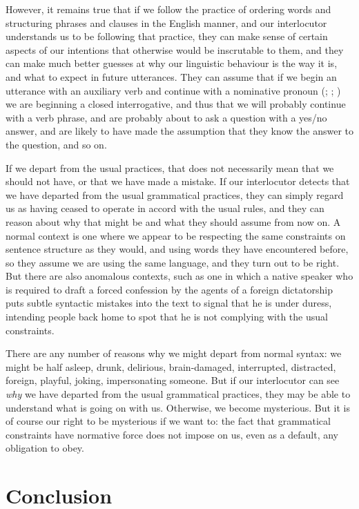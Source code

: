 \documentclass[output=paper]{langscibook}
\begin{document}
However, it remains true that if we follow the practice of ordering words and structuring phrases and clauses in the English manner, and our interlocutor understands us to be following that practice, they can make sense of certain aspects of our intentions that otherwise would be inscrutable to them, and they can make much better guesses at why our linguistic behaviour is the way it is, and what to expect in future utterances.  They can assume that if we begin an utterance with an auxiliary verb and continue with a nominative pronoun (; ; ) we are beginning a closed interrogative, and thus that we will probably continue with a verb phrase, and are probably about to ask a question with a yes/no answer, and are likely to have made the assumption that they know the answer to the question, and so on.

If we depart from the usual practices, that does not necessarily mean that we should not have, or that we have made a mistake.  If our interlocutor detects that we have departed from the usual grammatical practices, they can simply regard us as having ceased to operate in accord with the usual rules, and they can reason about why that might be and what they should assume from now on. A normal context is one where we appear to be respecting the same constraints on sentence structure as they would, and using words they have encountered before, so they assume we are using the same language, and they turn out to be right. But there are also anomalous contexts, such as one in which a native speaker who is required to draft a forced confession by the agents of a foreign dictatorship puts subtle syntactic mistakes into the text to signal that he is under duress, intending people back home to spot that he is not complying with the usual constraints.

There are any number of reasons why we might depart from normal syntax: we might be half asleep, drunk, delirious, brain-damaged, interrupted, distracted, foreign, playful, joking, impersonating someone. But if our interlocutor can see \emph{why} we have departed from the usual grammatical practices, they may be able to understand what is going on with us. Otherwise, we become mysterious. But it is of course our right to be mysterious if we want to: the fact that grammatical constraints have normative force does not impose on us, even as a default, any obligation to obey.

\section{Conclusion}
\label{sec:pullum:conc}
\end{document}
